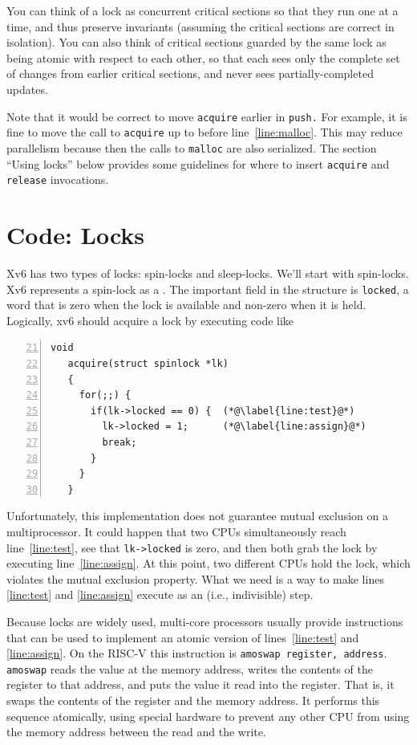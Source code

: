 You can think of a lock as
concurrent critical sections so that they run one at a time,
and thus preserve invariants (assuming the critical sections
are correct in isolation).
You can also think of critical sections guarded by the same lock as being
atomic with respect to each other,
so that each sees only the complete set of
changes from earlier critical sections, and never sees
partially-completed updates.

Note that it would be correct to move
\lstinline{acquire}
earlier in
\lstinline{push.}
For example, it is fine to move the call to
\lstinline{acquire}
up to before line~\ref{line:malloc}.
This may reduce parallelism because then the calls
to
\lstinline{malloc}
are also serialized.
The section ``Using locks'' below provides some guidelines for where to insert
\lstinline{acquire}
and
\lstinline{release}
invocations.
\section{Code: Locks}
Xv6 has two types of locks: spin-locks and sleep-locks.
We'll start with spin-locks.
Xv6 represents a spin-lock as a
.
The important field in the structure is
\lstinline{locked},
a word that is zero when the lock is available
and non-zero when it is held.
Logically, xv6 should acquire a lock by executing code like
\begin{lstlisting}[numbers=left,firstnumber=21]
   void
   acquire(struct spinlock *lk)
   {
     for(;;) {
       if(lk->locked == 0) {  (*@\label{line:test}@*)
         lk->locked = 1;      (*@\label{line:assign}@*)
         break;
       }
     }
   }
\end{lstlisting}
Unfortunately, this implementation does not
guarantee mutual exclusion on a multiprocessor.
It could happen that two CPUs simultaneously
reach line~\ref{line:test}, see that 
\lstinline{lk->locked}
is zero, and then both grab the lock by executing line~\ref{line:assign}.
At this point, two different CPUs hold the lock,
which violates the mutual exclusion property.
What we need is a way to
make lines \ref{line:test} and \ref{line:assign} execute as an
(i.e., indivisible) step.

Because locks are widely used,
multi-core processors usually provide instructions that
can be used to implement an atomic version of
lines~\ref{line:test} and \ref{line:assign}.
On the RISC-V this instruction is
\lstinline{amoswap register, address}.
\lstinline{amoswap}
reads the value at the memory address,
writes the contents of the register to that address,
and puts the value it read into the register.
That is, it swaps the contents of the register and the memory address.
It performs this sequence atomically, using special
hardware to prevent any
other CPU from using the memory address between the read and the write.

